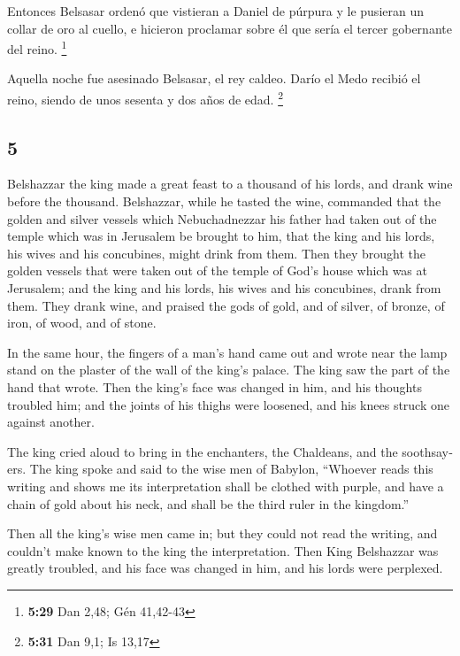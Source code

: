 \begin{paracol}{2}
 Entonces Belsasar ordenó que vistieran a Daniel de
púrpura y le pusieran un collar de oro al cuello, e hicieron proclamar
sobre él que sería el tercer gobernante del reino. \footnote{\textbf{5:29}
  Dan 2,48; Gén 41,42-43}

 Aquella noche fue asesinado Belsasar, el rey caldeo.
 Darío el Medo recibió el reino, siendo de unos sesenta y
dos años de edad. \footnote{\textbf{5:31} Dan 9,1; Is 13,17}

\switchcolumn
\begin{otherlanguage}{english}

\hypertarget{section-9}{%
\section{5}\label{section-9}}

 Belshazzar the king made a great feast to a thousand of
his lords, and drank wine before the thousand. 
Belshazzar, while he tasted the wine, commanded that the golden and
silver vessels which Nebuchadnezzar his father had taken out of the
temple which was in Jerusalem be brought to him, that the king and his
lords, his wives and his concubines, might drink from them.
 Then they brought the golden vessels that were taken out
of the temple of God's house which was at Jerusalem; and the king and
his lords, his wives and his concubines, drank from them. 
They drank wine, and praised the gods of gold, and of silver, of bronze,
of iron, of wood, and of stone.

 In the same hour, the fingers of a man's hand came out
and wrote near the lamp stand on the plaster of the wall of the king's
palace. The king saw the part of the hand that wrote. 
Then the king's face was changed in him, and his thoughts troubled him;
and the joints of his thighs were loosened, and his knees struck one
against another.

 The king cried aloud to bring in the enchanters, the
Chaldeans, and the soothsayers. The king spoke and said to the wise men
of Babylon, ``Whoever reads this writing and shows me its interpretation
shall be clothed with purple, and have a chain of gold about his neck,
and shall be the third ruler in the kingdom.''

 Then all the king's wise men came in; but they could not
read the writing, and couldn't make known to the king the
interpretation.  Then King Belshazzar was greatly
troubled, and his face was changed in him, and his lords were perplexed.


\end{otherlanguage}
\end{paracol}
